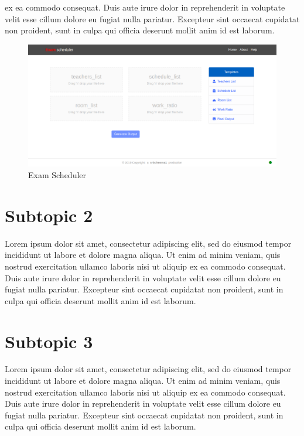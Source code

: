 \documentclass[a4paper,12 pt,oneside]{book}
\begin{document}
ex ea commodo consequat. Duis aute irure dolor in reprehenderit in voluptate velit esse cillum dolore eu fugiat nulla pariatur. Excepteur sint occaecat cupidatat non proident, sunt in culpa qui officia deserunt mollit anim id est laborum.

\begin{figure}[h]
    \centering
    \includegraphics[width=\textwidth]{images/es.png}
    \caption{Exam Scheduler}
    \label{fig:pg}
\end{figure}

\section{Subtopic 2}

Lorem ipsum dolor sit amet, consectetur adipiscing elit, sed do eiusmod tempor incididunt ut labore et dolore magna aliqua. Ut enim ad minim veniam, quis nostrud exercitation ullamco laboris nisi ut aliquip ex ea commodo consequat. Duis aute irure dolor in reprehenderit in voluptate velit esse cillum dolore eu fugiat nulla pariatur. Excepteur sint occaecat cupidatat non proident, sunt in culpa qui officia deserunt mollit anim id est laborum.

\section{Subtopic 3}

Lorem ipsum dolor sit amet, consectetur adipiscing elit, sed do eiusmod tempor incididunt ut labore et dolore magna aliqua. Ut enim ad minim veniam, quis nostrud exercitation ullamco laboris nisi ut aliquip ex ea commodo consequat. Duis aute irure dolor in reprehenderit in voluptate velit esse cillum dolore eu fugiat nulla pariatur. Excepteur sint occaecat cupidatat non proident, sunt in culpa qui officia deserunt mollit anim id est laborum.
\end{document}
